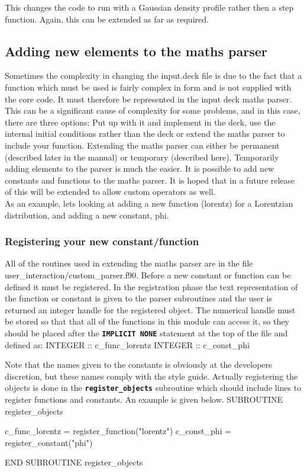 \documentclass[12pt,a4paper]{article}
\newcommand{\inlinecode}[1]{{\color{warwickred} \bf\texttt{#1}}}
\newcommand{\EPOCH}{{\color{warwickdark}\fontfamily{phv}\selectfont{EPOCH}}}
\newenvironment{boxverbatim}{\lboxverbatim{none}}{\endlboxverbatim}
\begin{document}
This changes the code to run with a Gaussian density profile rather then a step
function. Again, this can be extended as far as required.

\subsection{Adding new elements to the maths parser}
Sometimes the complexity in changing the input.deck file is due to the fact that
a function which must be used is fairly complex in form and is not supplied
with the core code. It must therefore be represented in the input deck maths
parser. This can be a significant cause of complexity for some problems, and
in this case, there are three options: Put up with it and implement in the
deck, use the internal initial conditions rather than the deck or extend the
maths parser to include your function. Extending the maths parser can either
be permanent (described later in the manual) or temporary (described
here). Temporarily adding elements to the parser is much the easier. It is
possible to add new constants and functions to the maths parser. It is hoped
that in a future release of {\EPOCH} this will be extended to allow custom
operators as well.\\

As an example, lets looking at adding a new function (lorentz) for a
Lorentzian distribution, and adding a new constant, phi.

\subsubsection{Registering your new constant/function}
All of the routines used in extending the maths parser are in the file
user\_interaction/custom\_parser.f90.  Before a new constant or function
can be defined it must be registered. In the registration phase the text
representation of the function or constant is given to the parser subroutines
and the user is returned an integer handle for the registered object. The
numerical handle must be stored so that that all of the functions in this
module can access it, so they should be placed after the \inlinecode{IMPLICIT
NONE} statement at the top of the file and defined as:
\begin{boxverbatim}
INTEGER :: c_func_lorentz
INTEGER :: c_const_phi
\end{boxverbatim}

Note that the names given to the constants is obviously at the developers
discretion, but these names comply with the {\EPOCH} style guide.
Actually registering the objects is done in the \inlinecode{register\_objects}
subroutine which should include lines to register functions and constants.
An example is given below.
\begin{boxverbatim}
SUBROUTINE register_objects

  c_func_lorentz = register_function("lorentz")
  c_const_phi = register_constant("phi")

END SUBROUTINE register_objects
\end{boxverbatim}
\end{document}
